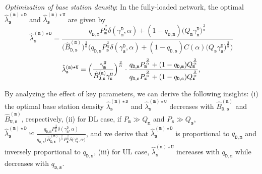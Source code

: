 \documentclass[twocolumn,english]{IEEEtran}
\theoremstyle{plain}
\theoremstyle{definition}
\begin{document}
\emph{Optimization of base station density}: In the fully-loaded network,
the optimal $\hat{\lambda}_{\mathtt{s}}^{\mathtt{\left(m\right)\star D}}$
and $\hat{\lambda}_{\mathtt{s}}^{\mathtt{\left(m\right)\star U}}$
are given by
\begin{equation}
\hat{\lambda}_{\mathtt{s}}^{(\mathtt{m})\star\mathtt{D}}=\frac{q_{\mathtt{D,m}}P_{\mathtt{m}}^{\frac{2}{\alpha}}\delta(\gamma_{\mathtt{m}}^{\mathtt{D}},\alpha)+(1-q_{\mathtt{D},\mathtt{m}})\bigl(Q_{\mathtt{m}}\gamma_{\mathtt{m}}^{\mathtt{D}}\bigr)^{\frac{2}{\alpha}}}{\bigl(\hat{B}_{\mathtt{D,s}}^{(\mathtt{m})}\bigr)^{\frac{2}{\alpha}}\bigl(q_{\mathtt{D,s}}P_{\mathtt{s}}^{\frac{2}{\alpha}}\delta(\gamma_{\mathtt{s}}^{\mathtt{D}},\alpha)+(1-q_{\mathtt{D},\mathtt{s}})C(\alpha)\bigl(Q_{\mathtt{s}}\gamma_{\mathtt{s}}^{\mathtt{D}}\bigr)^{\frac{2}{\alpha}}\bigr)}\label{eq:Op_dens_D}
\end{equation}
\begin{equation}
\hat{\lambda}_{\mathtt{s}}^{(\mathtt{m})\star\mathtt{U}}=\Bigl(\frac{\gamma_{\mathtt{m}}^{\mathtt{U}}}{\hat{B}_{\mathtt{U,s}}^{(\mathtt{m})}\gamma_{\mathtt{s}}^{\mathtt{U}}}\Bigr)^{\frac{2}{\alpha}}\cdot\frac{q_{\mathtt{D},\mathtt{m}}P_{\mathtt{m}}^{\frac{2}{\alpha}}+(1-q_{\mathtt{D},\mathtt{m}})Q_{\mathtt{m}}^{\frac{2}{\alpha}}}{q_{\mathtt{D},\mathtt{s}}P_{\mathtt{s}}^{\frac{2}{\alpha}}+(1-q_{\mathtt{D},\mathtt{s}})Q_{\mathtt{s}}^{\frac{2}{\alpha}}},\label{eq:Op_dens_U}
\end{equation}


By analyzing the effect of key parameters, we can derive the following
insights: (i) the optimal base station density $\hat{\lambda}_{\mathtt{s}}^{(\mathtt{m})\star\mathtt{D}}$
and $\hat{\lambda}_{\mathtt{s}}^{(\mathtt{m})\star\mathtt{U}}$ decreases
with $\hat{B}_{\mathtt{D,s}}^{(\mathtt{m})}$ and $\hat{B}_{\mathtt{U,s}}^{(\mathtt{m})}$,
respectively, (ii) for DL case, if $P_{\mathtt{m}}\gg Q_{\mathtt{m}}$
and $P_{\mathtt{s}}\gg Q_{\mathtt{s}}$, $\hat{\lambda}_{\mathtt{s}}^{(\mathtt{m})\star\mathtt{D}}\backsimeq\frac{q_{\mathtt{D,m}}P_{\mathtt{m}}^{\frac{2}{\alpha}}\delta\left(\gamma_{\mathtt{m}}^{\mathtt{D}},\alpha\right)}{q_{\mathtt{D,s}}\bigl(\hat{B}_{\mathtt{D,s}}^{(\mathtt{m})}\bigr)^{\frac{2}{\alpha}}P_{\mathtt{s}}^{\frac{2}{\alpha}}\delta\bigl(\gamma_{\mathtt{s}}^{\mathtt{D}},\alpha\bigr)}$,
and we derive that $\hat{\lambda}_{\mathtt{s}}^{(\mathtt{m})\star\mathtt{D}}$
is proportional to $q_{\mathtt{D,m}}$ and inversely proportional
to $q_{\mathtt{D,s}}$, (iii) for UL case, $\hat{\lambda}_{\mathtt{s}}^{(\mathtt{m})\star\mathtt{U}}$
increases with $q_{\mathtt{D,m}}$ while decreases with $q_{\mathtt{D,s}}$.
\end{document}
